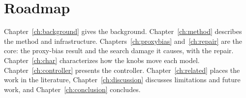 \section{Roadmap}

Chapter~\ref{ch:background} gives the background. Chapter~\ref{ch:method} describes the
method and infrastructure. Chapters~\ref{ch:proxybias} and~\ref{ch:repair} are the core: the
proxy-bias result and the search damage it causes, with the repair. Chapter~\ref{ch:char}
characterizes how the knobs move each model. Chapter~\ref{ch:controller} presents the
controller. Chapter~\ref{ch:related} places the work in the literature,
Chapter~\ref{ch:discussion} discusses limitations and future work, and
Chapter~\ref{ch:conclusion} concludes.
